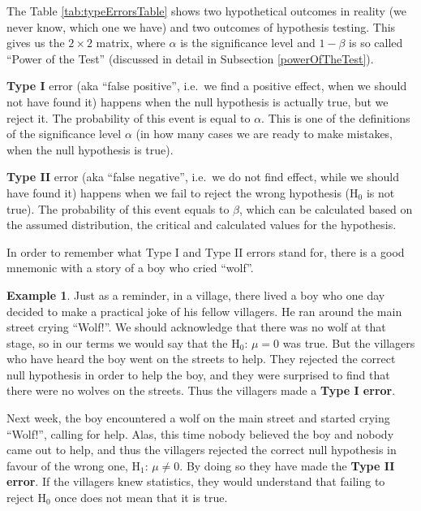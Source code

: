 \documentclass[
]{book}
\theoremstyle{definition}
\theoremstyle{definition}
\newtheorem{example}{Example}[chapter]
\theoremstyle{definition}
\theoremstyle{definition}
\theoremstyle{remark}
\begin{document}
The Table \ref{tab:typeErrorsTable} shows two hypothetical outcomes in reality (we never know, which one we have) and two outcomes of hypothesis testing. This gives us the \(2\times 2\) matrix, where \(\alpha\) is the significance level and \(1-\beta\) is so called ``Power of the Test'' (discussed in detail in Subsection \ref{powerOfTheTest}).

\textbf{Type I} error (aka ``false positive'', i.e.~we find a positive effect, when we should not have found it) happens when the null hypothesis is actually true, but we reject it. The probability of this event is equal to \(\alpha\). This is one of the definitions of the significance level \(\alpha\) (in how many cases we are ready to make mistakes, when the null hypothesis is true).

\textbf{Type II} error (aka ``false negative'', i.e.~we do not find effect, while we should have found it) happens when we fail to reject the wrong hypothesis (\(\mathrm{H}_0\) is not true). The probability of this event equals to \(\beta\), which can be calculated based on the assumed distribution, the critical and calculated values for the hypothesis.

In order to remember what Type I and Type II errors stand for, there is a good mnemonic with a story of a boy who cried ``wolf''.

\begin{example}
Just as a reminder, in a village, there lived a boy who one day decided to make a practical joke of his fellow villagers. He ran around the main street crying ``Wolf!''. We should acknowledge that there was no wolf at that stage, so in our terms we would say that the \(\mathrm{H}_0\): \(\mu=0\) was true. But the villagers who have heard the boy went on the streets to help. They rejected the correct null hypothesis in order to help the boy, and they were surprised to find that there were no wolves on the streets. Thus the villagers made a \textbf{Type I error}.

Next week, the boy encountered a wolf on the main street and started crying ``Wolf!'', calling for help. Alas, this time nobody believed the boy and nobody came out to help, and thus the villagers rejected the correct null hypothesis in favour of the wrong one, \(\mathrm{H}_1\): \(\mu\neq 0\). By doing so they have made the \textbf{Type II error}. If the villagers knew statistics, they would understand that failing to reject \(\mathrm{H}_0\) once does not mean that it is true.
\end{example}
\end{document}
